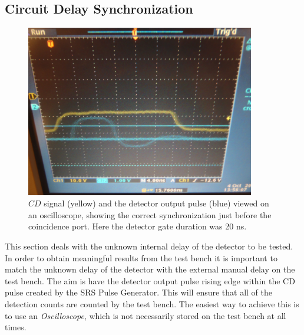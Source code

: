\documentclass{article}
\begin{document}
\subsection{Circuit Delay Synchronization}

\begin{figure}
\centering
\includegraphics[width=10cm]{images/trace.JPG}
\caption{$CD$ signal (yellow) and the detector output pulse (blue) viewed on an oscilloscope, showing the correct synchronization just before the coincidence port. Here the detector gate duration was 20 ns.}
\label{trace}
\end{figure}

This section deals with the unknown internal delay of the detector to be tested. In order to obtain meaningful results from the test bench it is important to match the unknown delay of the detector with the external manual delay on the test bench. The aim is have the detector output pulse rising edge within the CD pulse created by the SRS Pulse Generator. This will ensure that all of the detection counts are counted by the test bench. The easiest way to achieve this is to use an \emph{Oscilloscope}, which is not necessarily stored on the test bench at all times.
\end{document}
